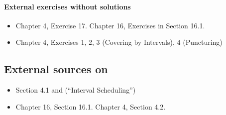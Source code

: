 \paragraph{External exercises without solutions}
\begin{itemize}
\item \KT Chapter 4, Exercise 17.  \CLRS Chapter 16, Exercises in Section 16.1.
\item \JE Chapter 4, Exercises 1, 2, 3 (Covering by Intervals), 4 (Puncturing)
\end{itemize}

\subsection{External sources on }

\begin{itemize}
\item \KT Section 4.1 and \KWSlides (``Interval Scheduling'')
\item  \CLRS Chapter 16, Section 16.1.  \JE Chapter 4, Section 4.2.
\end{itemize}






